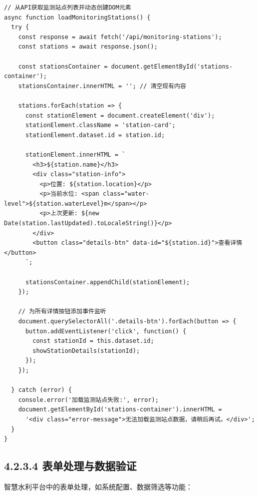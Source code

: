 \begin{lstlisting}
// 从API获取监测站点列表并动态创建DOM元素
async function loadMonitoringStations() {
  try {
    const response = await fetch('/api/monitoring-stations');
    const stations = await response.json();
    
    const stationsContainer = document.getElementById('stations-container');
    stationsContainer.innerHTML = ''; // 清空现有内容
    
    stations.forEach(station => {
      const stationElement = document.createElement('div');
      stationElement.className = 'station-card';
      stationElement.dataset.id = station.id;
      
      stationElement.innerHTML = `
        <h3>${station.name}</h3>
        <div class="station-info">
          <p>位置: ${station.location}</p>
          <p>当前水位: <span class="water-level">${station.waterLevel}m</span></p>
          <p>上次更新: ${new Date(station.lastUpdated).toLocaleString()}</p>
        </div>
        <button class="details-btn" data-id="${station.id}">查看详情</button>
      `;
      
      stationsContainer.appendChild(stationElement);
    });
    
    // 为所有详情按钮添加事件监听
    document.querySelectorAll('.details-btn').forEach(button => {
      button.addEventListener('click', function() {
        const stationId = this.dataset.id;
        showStationDetails(stationId);
      });
    });
    
  } catch (error) {
    console.error('加载监测站点失败:', error);
    document.getElementById('stations-container').innerHTML = 
      '<div class="error-message">无法加载监测站点数据，请稍后再试。</div>';
  }
}
\end{lstlisting}

\subsection{4.2.3.4
表单处理与数据验证}\label{ux8868ux5355ux5904ux7406ux4e0eux6570ux636eux9a8cux8bc1}

智慧水利平台中的表单处理，如系统配置、数据筛选等功能：

